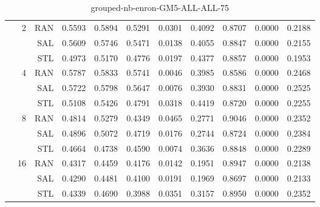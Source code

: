 \begin{center}
\begin{table}[htbp]
\begin{tabular}{ | r | r | r | r | r | r | r | r | r | r | r |}
 & \multirow{3}{*}{2} & RAN & 0.5593 & 0.5894 & 0.5291 & 0.0301 & 0.4092 & 0.8707 & 0.0000 & 0.2188\\ \cline{3-11}
 &   & SAL & 0.5609 & 0.5746 & 0.5471 & 0.0138 & 0.4055 & 0.8847 & 0.0000 & 0.2155\\ \cline{3-11}
 &   & STL & 0.4973 & 0.5170 & 0.4776 & 0.0197 & 0.4377 & 0.8857 & 0.0000 & 0.1953\\ \cline{2-11}
 & \multirow{3}{*}{4} & RAN & 0.5787 & 0.5833 & 0.5741 & 0.0046 & 0.3985 & 0.8586 & 0.0000 & 0.2468\\ \cline{3-11}
 &   & SAL & 0.5722 & 0.5798 & 0.5647 & 0.0076 & 0.3930 & 0.8831 & 0.0000 & 0.2525\\ \cline{3-11}
 &   & STL & 0.5108 & 0.5426 & 0.4791 & 0.0318 & 0.4419 & 0.8720 & 0.0000 & 0.2255\\ \cline{2-11}
 & \multirow{3}{*}{8} & RAN & 0.4814 & 0.5279 & 0.4349 & 0.0465 & 0.2771 & 0.9046 & 0.0000 & 0.2352\\ \cline{3-11}
 &   & SAL & 0.4896 & 0.5072 & 0.4719 & 0.0176 & 0.2744 & 0.8724 & 0.0000 & 0.2384\\ \cline{3-11}
 &   & STL & 0.4664 & 0.4738 & 0.4590 & 0.0074 & 0.3636 & 0.8848 & 0.0000 & 0.2289\\ \cline{2-11}
 & \multirow{3}{*}{16} & RAN & 0.4317 & 0.4459 & 0.4176 & 0.0142 & 0.1951 & 0.8947 & 0.0000 & 0.2138\\ \cline{3-11}
 &   & SAL & 0.4290 & 0.4481 & 0.4100 & 0.0191 & 0.1969 & 0.8697 & 0.0000 & 0.2133\\ \cline{3-11}
 &   & STL & 0.4339 & 0.4690 & 0.3988 & 0.0351 & 0.3157 & 0.8950 & 0.0000 & 0.2352\\ \cline{2-11}
\hline
\end{tabular}
\caption{grouped-nb-enron-GM5-ALL-ALL-75}
\end{table}
\end{center}

